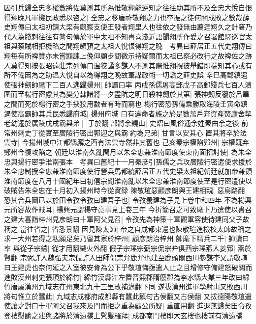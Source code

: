 因引兵歸全忠多權數將佐莫測其所為惟敬翔能逆知之往往助其所不及全忠大悅自恨得翔晚凡軍機民政悉以咨之|{
	全忠之移唐祚敬翔之力也李振之徒何關成敗之數哉薛史翔傳曰太祖初鎮大梁有觀察支使王發者翔里人也往依之發無由薦逹翔久之計窘乃代人為牋刺往往有警句傳於軍中太祖不知書喜淺近語聞翔所作愛之召署館驛巡官太祖與蔡賊相拒機略之間翔頗預之太祖大悅恨得翔之晚　考異曰薛居正五代史翔傳曰翔每有所禆贊亦未嘗顯諫上俛仰顧步間微示持疑爾而太祖已察必改行之故禆佐之跡人莫得知按張昭遠莊宗列傳曰温狡譎多謀人不測其際惟翔視彼舉錯即揣知其心或有所不備因為之助温大悅自以為得翔之晚故軍謀政術一切諮之薛史誤}
辛巳高郵鎮遏使張神劒帥麾下二百人逃歸揚州|{
	帥讀曰率}
丙戍孫儒屠高郵戊子高郵殘兵七百人潰圍而至楊行密慮其為變分隸諸將一夕盡阬之明日殺神劒於其第|{
	張神劒反覆於呂畢之間而死於楊行密之手挾狡用數者有時而窮也}
楊行密恐孫儒乘勝取海陵壬寅命鎮遏使高霸帥其兵民悉歸府城|{
	揚州府城}
曰有違命者族之於是數萬戶弃資產焚廬舍挈老幼遷於廣陵戊戌霸與弟|{
	于於翻}
部將余繞山|{
	史炤曰風俗通余姓秦由余之後}
前常州刺史丁從實至廣陵行密出郭迎之與霸約為兄弟|{
	甘言以安其心}
置其將卒於法雲寺|{
	今揚州城中江都縣廨之西有法雲寺然非其舊也}
己亥秦宗權陷鄭州|{
	宗權既弃鄭州今復攻陷之}
朝廷以淮南久亂閏月以朱全忠兼淮南節度使東南面招討使|{
	為朱全忠與揚行密爭淮南張本　考異曰舊紀十一月秦彦引孫儒之兵攻廣陵行密遣使求援於朱全忠制授全忠兼淮南節度使行營兵馬都統薛居正五代史梁太祖紀朝廷就加帝兼領淮南節度在八月十國紀年曰初僖宗聞淮南亂以朱全忠兼淮南節度使至是行密遣使以破賊告朱全忠在十月初入揚州時今從實録}
陳敬瑄惡顧彦朗與王建相親|{
	惡烏路翻}
恐其合兵圖已謀於田令孜令孜曰建吾子也|{
	令孜養建為子見上卷中和四年}
不為楊興元所容故作賊耳|{
	楊興元謂楊守亮事見上卷三年}
今折簡召之可致麾下乃遣使以書召之建大喜詣梓州見彦朗曰十軍阿父見召|{
	令孜先為神策十軍觀軍容使待建同父子故稱之}
當往省之|{
	省悉景翻}
因見陳太師|{
	帝之自成都東還也陳敬瑄進檢校太師故稱之}
求一大州若得之私願足矣乃留其家於梓州|{
	顧彦朗治梓州}
帥麾下精兵二千|{
	帥讀曰率}
與從子宗鐬|{
	從才用翻鐬火外翻}
假子宗瑤宗弼宗侃宗弁俱西宗瑤燕人姜郅|{
	燕於賢翻}
宗弼許人魏弘夫宗侃許人田師侃宗弁鹿弁也建至鹿頭關西川參謀李乂謂敬瑄曰王建虎也奈何延之入室彼安肯為公下乎敬瑄悔亟遣人止之且增修守備建怒破關而進敗漢州刺史張頊於綿竹|{
	綿竹漢縣江左置晉熙郡隋廢郡為李水縣大業三年改曰綿竹唐屬漢州九域志在州東北九十三里敗補邁翻下同}
遂拔漢州進軍學射山又敗西川將句惟立於蠶此|{
	九域志成都府成都縣有蠶此鎮句古侯翻又古侯翻}
又拔德陽敬瑄遣使讓之對曰十軍阿父召我來及門而拒之重為顧公所疑|{
	重直用翻}
進退無歸矣田令孜登樓慰諭之建與諸將於清遠橋上髠髪羅拜|{
	成都南門樓即大玄樓也樓前有清遠橋}
